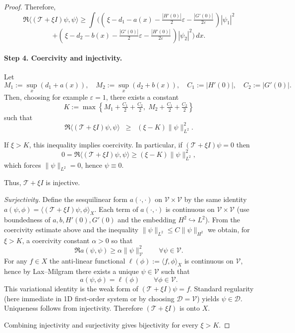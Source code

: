 \documentclass[a4paper,11pt]{amsart}
\theoremstyle{definition}
\numberwithin{equation}{section}
\theoremstyle{definition}
\begin{document}
\begin{proof}
Therefore,
\[
\Re\langle (\mathscr{T}+\xi I)\psi,\psi\rangle
\geq \int \Big( (\,\xi - d_1 - a(x) - \tfrac{|H'(0)|}{2}\varepsilon - \tfrac{|G'(0)|}{2\varepsilon}\,) |\psi_1|^2
\]
\[
+ (\,\xi - d_2 - b(x) - \tfrac{|G'(0)|}{2}\varepsilon - \tfrac{|H'(0)|}{2\varepsilon}\,) |\psi_2|^2 \Big)\,dx.
\]



\paragraph{Step 4. Coercivity and injectivity.}
Let
\[
M_1 := \sup_x (d_1+a(x)), \quad
M_2 := \sup_x (d_2+b(x)), \quad
C_1:=|H'(0)|, \quad C_2:=|G'(0)|.
\]
Then, choosing for example $\varepsilon=1$, there exists a constant
\[
K := \max\left\{ M_1 + \tfrac{C_1}{2}+\tfrac{C_2}{2}, \; M_2 + \tfrac{C_1}{2}+\tfrac{C_2}{2} \right\}
\]
such that
\[
\Re\langle (\mathscr{T}+\xi I)\psi,\psi\rangle
\;\;\geq\;\; (\xi-K)\|\psi\|_{L^2}^2.
\]

If $\xi>K$, this inequality implies coercivity. In particular, if $(\mathscr{T}+\xi I)\psi=0$ then
\[
0 = \Re\langle (\mathscr{T}+\xi I)\psi,\psi\rangle \geq (\xi-K)\|\psi\|_{L^2}^2,
\]
which forces $\|\psi\|_{L^2}=0$, hence $\psi\equiv 0$.

Thus, $\mathscr{T}+\xi I$ is injective.




\emph{Surjectivity.} Define the sesquilinear form $a(\cdot,\cdot)$ on $\mathcal V\times\mathcal V$ by the same identity
$a(\psi,\phi)=\langle(\mathscr T+\xi I)\psi,\phi\rangle_X$. Each term of $a(\cdot,\cdot)$ is continuous on $\mathcal V\times\mathcal V$ (use boundedness of $a,b,H'(0),G'(0)$ and the embedding $H^2\hookrightarrow L^2$). From the coercivity estimate above and the inequality $\|\psi\|_{L^2}\leq C\|\psi\|_{H^2}$ we obtain, for $\xi>K$, a coercivity constant $\alpha>0$ so that
\[
\Re a(\psi,\psi)\geq \alpha\|\psi\|_{\mathcal V}^2\qquad\forall\psi\in\mathcal V.
\]
For any $f\in X$ the anti-linear functional $\ell(\phi):=\langle f,\phi\rangle_X$ is continuous on $\mathcal V$, hence by Lax--Milgram there exists a unique $\psi\in\mathcal V$ such that
\[
a(\psi,\phi)=\ell(\phi)\qquad\forall\phi\in\mathcal V.
\]
This variational identity is the weak form of $(\mathscr T+\xi I)\psi=f$. Standard regularity (here immediate in 1D first-order system or by choosing $\mathcal D=\mathcal V$) yields $\psi\in\mathcal D$. Uniqueness follows from injectivity. Therefore $(\mathscr T+\xi I)$ is onto $X$.

Combining injectivity and surjectivity gives bijectivity for every $\xi>K$.


\end{proof}
\end{document}
